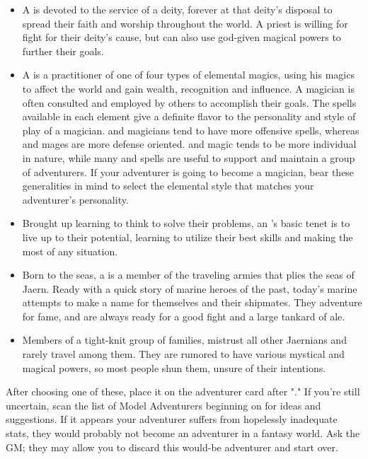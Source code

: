 \begin{multicols*}{2}
\begin{itemize}
\item A  is devoted to the service of a deity, forever at that deity's disposal to spread their faith and worship throughout the world. A priest is willing for fight for their deity's cause, but can also use god-given magical powers to further their goals.

\item A  is a practitioner of one of four types of elemental magics, using his magics to affect the world and gain wealth, recognition and influence. A magician is often consulted and employed by others to accomplish their goals.
The spells available in each element give a definite flavor to the personality and style of play of a magician.  and  magicians tend to have more offensive spells, whereas  and  mages are more defense oriented.  and  magic tends to be more individual in nature, while many  and  spells are useful to support and maintain a group of adventurers. If your adventurer is going to become a magician, bear these generalities in mind to select the elemental style that matches your adventurer's personality.

\item Brought up learning to think to solve their problems, an 's basic tenet is to live up to their potential, learning to utilize their best skills and making the most of any situation.
\item Born to the seas, a  is a member of the traveling armies that plies the seas of Jaern. Ready with a quick story of marine heroes of the past, today's marine attempts to make a name for themselves and their shipmates. They adventure for fame, and are always ready for a good fight and a large tankard of ale.

\item Members of a tight-knit group of families,  mistrust all other Jaernians and rarely travel among them. They are rumored to have various mystical and magical powers, so most people shun them, unsure of their intentions.
\end{itemize}
After choosing one of these, place it on the adventurer card after "." If you're still uncertain, scan the list of Model Adventurers beginning on  for ideas and suggestions. If it appears your adventurer suffers from hopelessly inadequate stats, they would probably not become an adventurer in a fantasy world. Ask the GM; they may allow you to discard this would-be adventurer and start over.

\end{multicols*}
